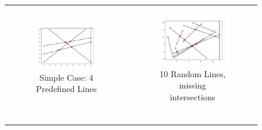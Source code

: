 \documentclass [12pt]{article}
\begin{document}
\begin{figure}[h]
\begin{tabular}{cc}
        \begin{subfigure}{0.5\textwidth}
            \centering
            \includegraphics[width=\textwidth]{images/4Lines.png}
            \caption{Simple Case: 4 Predefined Lines}
        \end{subfigure} &
        \begin{subfigure}{0.5\textwidth}
            \centering
            \includegraphics[width=\textwidth]{images/10LinesWrong.png}
            \caption{10 Random Lines, missing intersections}
        \end{subfigure} \\
        \begin{subfigure}{0.5\textwidth}
            \centering

\end{subfigure}
\end{tabular}
\end{figure}
\end{document}
